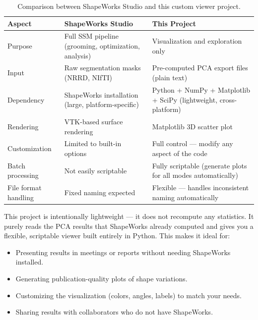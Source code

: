 \documentclass[12pt,a4paper]{article}
\begin{document}
\begin{table}[H]
\centering
\renewcommand{\arraystretch}{1.4}
\begin{tabular}{@{}lp{5.5cm}p{5.5cm}@{}}
\toprule
\textbf{Aspect} & \textbf{ShapeWorks Studio} & \textbf{This Project} \\
\midrule
Purpose & Full SSM pipeline (grooming, optimization, analysis) & Visualization and exploration only \\
Input & Raw segmentation masks (NRRD, NIfTI) & Pre-computed PCA export files (plain text) \\
Dependency & ShapeWorks installation (large, platform-specific) & Python + NumPy + Matplotlib + SciPy (lightweight, cross-platform) \\
Rendering & VTK-based surface rendering & Matplotlib 3D scatter plot \\
Customization & Limited to built-in options & Full control --- modify any aspect of the code \\
Batch processing & Not easily scriptable & Fully scriptable (generate plots for all modes automatically) \\
File format handling & Fixed naming expected & Flexible --- handles inconsistent naming automatically \\
\bottomrule
\end{tabular}
\caption{Comparison between ShapeWorks Studio and this custom viewer project.}
\label{tab:comparison}
\end{table}

\vspace{1em}

This project is intentionally lightweight --- it does not recompute any statistics. It purely reads the PCA results that ShapeWorks already computed and gives you a flexible, scriptable viewer built entirely in Python. This makes it ideal for:

\begin{itemize}
    \item Presenting results in meetings or reports without needing ShapeWorks installed.
    \item Generating publication-quality plots of shape variations.
    \item Customizing the visualization (colors, angles, labels) to match your needs.
    \item Sharing results with collaborators who do not have ShapeWorks.
\end{itemize}

\end{document}
